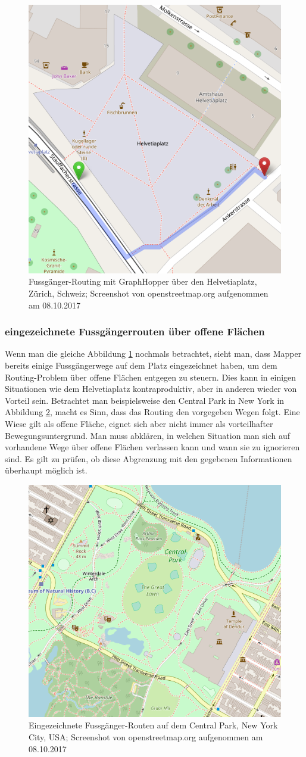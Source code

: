 \begin{figure}[ht]
	\centering
	\includegraphics[width=0.5\linewidth]{technicalreport/img/helvetiaplatz_graphhopper}
	\caption[Fussgänger-Routing]{Fussgänger-Routing mit GraphHopper \cite{graphhopper} über den Helvetiaplatz, Zürich, Schweiz; Screenshot von openstreetmap.org aufgenommen am 08.10.2017}
	\label{fig:helvetiaplatz_graphhopper}
\end{figure}

\subsubsection{eingezeichnete Fussgängerrouten über offene Flächen}
\label{problem:eingezeichnete Fussgängerrouten über offene Flächen}
Wenn man die gleiche Abbildung \ref{fig:helvetiaplatz_graphhopper} nochmals betrachtet, sieht man, dass Mapper bereits einige Fussgängerwege auf dem Platz eingezeichnet haben, um dem Routing-Problem über offene Flächen entgegen zu steuern. Dies kann in einigen Situationen wie dem Helvetiaplatz kontraproduktiv, aber in anderen wieder von Vorteil sein. Betrachtet man beispielsweise den Central Park in New York in Abbildung \ref{fig:central_park}, macht es Sinn, dass das Routing den vorgegeben Wegen folgt. Eine Wiese gilt als offene Fläche, eignet sich aber nicht immer als vorteilhafter Bewegungsuntergrund. Man muss abklären, in welchen Situation man sich auf vorhandene Wege über offene Flächen verlassen kann und wann sie zu ignorieren sind. Es gilt zu prüfen, ob diese Abgrenzung mit den gegebenen Informationen überhaupt möglich ist.

\begin{figure}[ht]
\centering
\includegraphics[width=0.5\linewidth]{technicalreport/img/central_park}
\caption[eingezeichnete Fussgänger-Routen]{Eingezeichnete Fussgänger-Routen auf dem Central Park, New York City, USA; Screenshot von openstreetmap.org aufgenommen am 08.10.2017}
\label{fig:central_park}
\end{figure}

